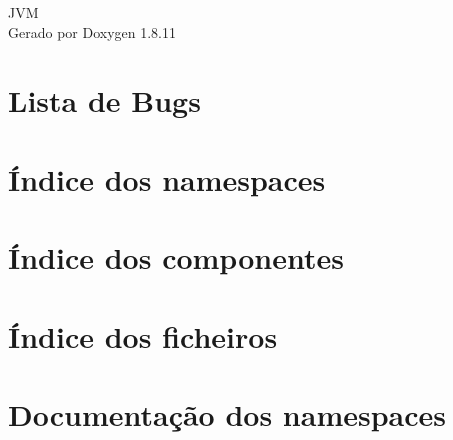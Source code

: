 \documentclass[twoside]{book}
\newcommand{\+}{\discretionary{\mbox{\scriptsize$\hookleftarrow$}}{}{}}
\newcommand{\clearemptydoublepage}{%
  \newpage{\pagestyle{empty}\cleardoublepage}%
}
\begin{document}
\hypersetup{pageanchor=false,
             bookmarksnumbered=true,
             pdfencoding=unicode
            }
\begin{titlepage}
\vspace*{7cm}
\begin{center}%
{\Large J\+VM }\\
\vspace*{1cm}
{\large Gerado por Doxygen 1.8.11}\\
\end{center}
\end{titlepage}
\clearemptydoublepage
\tableofcontents
\clearemptydoublepage
{}
\hypersetup{pageanchor=true}

\chapter{Lista de Bugs}
\label{bug}
\hypertarget{bug}{}

\chapter{Índice dos namespaces}

\chapter{Índice dos componentes}

\chapter{Índice dos ficheiros}

\chapter{Documentação dos namespaces}

\end{document}
